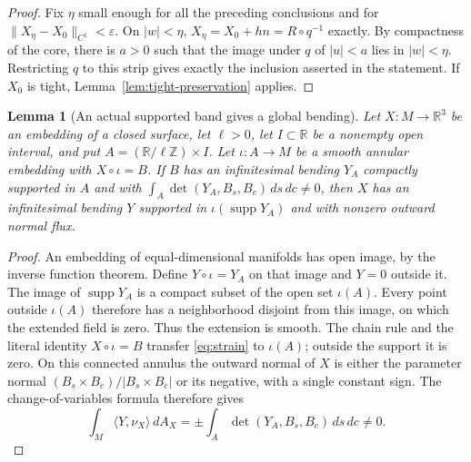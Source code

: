 \documentclass[11pt]{amsart}
\newtheorem{lemma}[theorem]{Lemma}
\theoremstyle{definition}
\newcommand{\R}{\mathbb R}
\DeclareMathOperator{\supp}{supp}
\begin{document}
\begin{proof}
Fix $\eta$ small enough for all the preceding conclusions and for
$\|X_\eta-X_0\|_{C^1}<\varepsilon$.
On $|w|<\eta$, $X_\eta=X_0+hn=R\circ q^{-1}$ exactly.
By compactness of the core, there is $a>0$ such that the image
under $q$ of $|u|<a$ lies in $|w|<\eta$. Restricting $q$ to
this strip gives exactly the inclusion asserted in the statement.
If $X_0$ is tight, Lemma~\ref{lem:tight-preservation} applies.
\end{proof}

\begin{lemma}[An actual supported band gives a global bending]
\label{lem:globalize}
Let $X:M\to\R^3$ be an embedding of a closed surface, let
$\ell>0$, let $I\subset\R$ be a nonempty open interval, and put
$A=(\R/\ell\mathbb Z)\times I$. Let $\iota:A\to M$ be a smooth
annular embedding with $X\circ\iota=B$.
If $B$ has an infinitesimal bending $Y_A$ compactly supported in $A$
and with $\int_A\det(Y_A,B_s,B_c)\,ds\,dc\ne0$, then $X$ has an
infinitesimal bending $Y$ supported in $\iota(\supp Y_A)$ and
with nonzero outward normal flux.
\end{lemma}
\begin{proof}
An embedding of equal-dimensional manifolds has open image, by
the inverse function theorem. Define $Y\circ\iota=Y_A$ on that
image and $Y=0$ outside it.
The image of $\supp Y_A$ is a compact subset of the open set
$\iota(A)$. Every point outside $\iota(A)$ therefore has a
neighborhood disjoint from this image, on which the extended
field is zero. Thus the extension is smooth.
The chain rule and the literal identity $X\circ\iota=B$ transfer
\eqref{eq:strain} to $\iota(A)$; outside the support it is zero.
On this connected annulus the outward normal of $X$ is either
the parameter normal $(B_s\times B_c)/|B_s\times B_c|$
or its negative, with a single constant sign. The
change-of-variables formula therefore gives
\[
 \int_M\langle Y,\nu_X\rangle\,dA_X
      =\pm\int_A\det(Y_A,B_s,B_c)\,ds\,dc\ne0.
\]
\end{proof}
\end{document}
